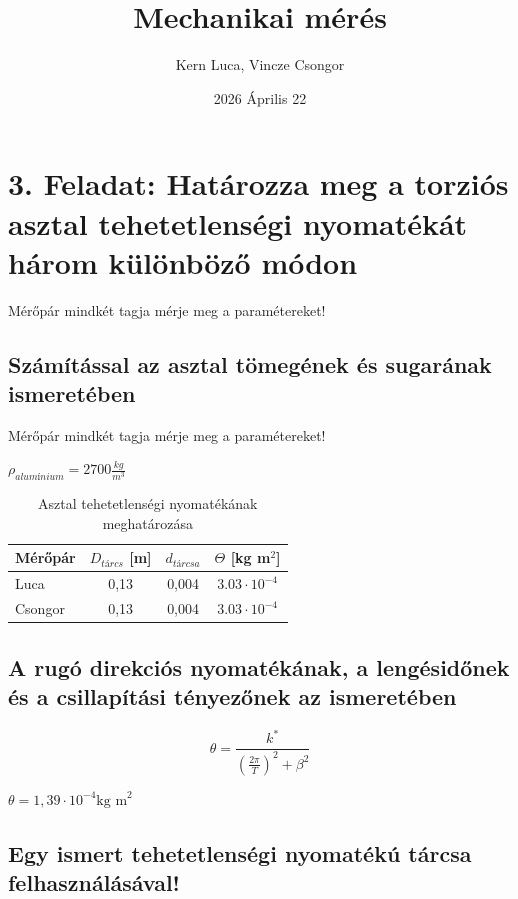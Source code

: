 \documentclass{article}
\title{Mechanikai mérés}
\author{Kern Luca, Vincze Csongor}
\date{2026 Április 22}
\begin{document}
\maketitle

\section*{3. Feladat: Határozza meg a torziós asztal tehetetlenségi nyomatékát három különböző módon}

Mérőpár mindkét tagja mérje meg a paramétereket!


\renewcommand{\thesubsection}{\alph{subsection})} %
\subsection{Számítással az asztal tömegének és sugarának ismeretében}

Mérőpár mindkét tagja mérje meg a paramétereket!

$\rho_{alumínium} = 2700 \frac{kg}{m^3}$

\begin{table}[H]
    \centering
    \renewcommand{\arraystretch}{1.2}
    \begin{tabular}{|l|c|c|c|}
        \hline
        Mérőpár & $D_{tárcs}$ [m] & $d_{tárcsa}$ & $\Theta$ [kg m$^2$] \\ \hline
        Luca& 0,13 & 0,004 & $3.03 \cdot 10^{-4}$ \\ \hline
        Csongor& 0,13 & 0,004 & $3.03 \cdot 10^{-4}$ \\ \hline
    \end{tabular}
    \caption{Asztal tehetetlenségi nyomatékának meghatározása}
    \label{tab:hotan_2}
\end{table}


\subsection{A rugó direkciós nyomatékának, a lengésidőnek és a csillapítási tényezőnek az ismeretében}

\[
\theta = \frac{k^{*}}{(\frac{2\pi}{T})^2 + \beta^2}
\]

$\theta= 1,39 \cdot 10^{-4} \text{kg m}^2$

\subsection{Egy ismert tehetetlenségi nyomatékú tárcsa felhasználásával!}
\end{document}
